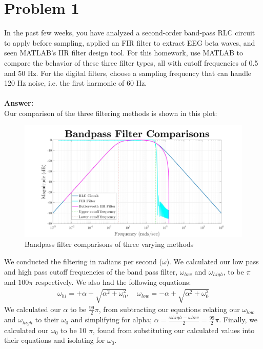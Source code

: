 \documentclass[12pt, a4paper]{article}
\begin{document}
\vspace*{-3mm}
\section*{Problem 1} 
In the past few weeks, you have analyzed a second-order band-pass RLC circuit to apply
before sampling, applied an FIR filter to extract EEG beta waves, and seen MATLAB’s IIR
filter design tool. For this homework, use MATLAB to compare the behavior of these three
filter types, all with cutoff frequencies of 0.5 and 50 Hz. For the digital filters, choose a
sampling frequency that can handle 120 Hz noise, i.e. the first harmonic of 60 Hz. \\ \\
\textbf{Answer: } \\ 
Our comparison of the three filtering methods is shown in this plot:
\begin{figure}[H]
\centering
\includegraphics[width=\textwidth]{bpf}
\caption{Bandpass filter comparisons of three varying methods}
\end{figure}
\noindent We conducted the filtering in radians per second ($\omega$). We calculated our low pass and high pass cutoff frequencies of the band pass filter, $\omega_{low}$ and $\omega_{high}$, to be $\pi$ and $100 \pi$ respectively. We also had the following equations: 
\begin{align*}
\omega_{h i}=+\alpha+\sqrt{\alpha^{2}+\omega_{0}^{2}}, \quad \omega_{l o w}=-\alpha+\sqrt{\alpha^{2}+\omega_{0}^{2}}
\end{align*}
We calculated our $\alpha$ to be $\frac{99}{2} \pi$, from subtracting our equations relating our $\omega_{low}$ and $\omega_{high}$ to their $\omega_0$ and simplifying for alpha; $\alpha = \frac{\omega{high}-\omega{low}}{2} = \frac{99}{2}\pi$. Finally, we calculated our $\omega_0$ to be 10 $\pi$, found from substituting our calculated values into their equations and isolating for $\omega_0$. \\ \\
\end{document}
